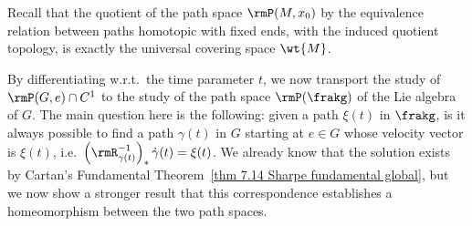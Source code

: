 Recall that the quotient of the path space $\rmP(M,x_0)$ by the equivalence relation between paths homotopic with fixed ends, with the induced quotient topology, is exactly the universal covering space $\wt{M}$.


By differentiating w.r.t.\ the time parameter $t$, we now transport the study of $\rmP(G,e)\cap C^1$ to the study of the path space $\rmP(\frakg)$ of the Lie algebra of $G$. The main question here is the following: given a path $\xi(t)$ in $\frakg$, is it always possible to find a path $\gamma(t)$ in $G$ starting at $e\in G$ whose velocity vector is $\xi(t)$, i.e.~$\left(\rmR_{\gamma(t)}^{-1}\right)_{\ast}\dot\gamma(t)=\xi(t)$. We already know that the solution exists by Cartan's Fundamental Theorem~\ref{thm 7.14 Sharpe fundamental global}, but we now show a stronger result that this correspondence establishes a homeomorphism between the two path spaces.

